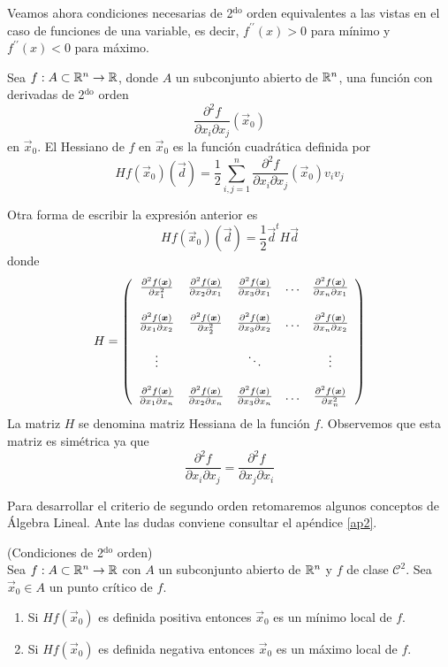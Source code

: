 Veamos ahora condiciones necesarias de 2$^{\text{do}}$ orden equivalentes a
las vistas en el caso de funciones de una variable, es decir, $f^{\prime
\prime}(x)>0$ para m\'inimo y $f^{\prime\prime}(x)<0$ para m\'aximo.
\begin{definicion}
Sea $f:A\subset \mathbb{R}^n \to \mathbb{R}$, donde $A$ un subconjunto abierto de $\mathbb{R}^{n}$, una funci\'on con
derivadas de 2$^{\text{do}}$ orden
\[
\frac{\partial^{2}f}{\partial x_i\partial x_{j}}(\vec{x}_{0})
\]
en $\vec{x}_{0}$. El Hessiano de $f$ en $\vec{x}_{0}$ es la funci\'on cuadr\'atica
definida por
\[
Hf(\vec{x}_{0})(\vec{d})=\frac{1}{2}\sum\limits_{i,j=1}^{n}\frac{\partial^{2}f}{\partial
x_i\partial x_{j}}(\vec{x}_{0})v_i v_{j}%
\]
\end{definicion}
Otra forma de escribir la expresi\'on anterior es
\[
Hf(\vec{x}_{0})(\vec{d})=\frac{1}{2}\vec{d}^t H \vec{d}
\]
donde
\begin{equation*}
H =\left(\begin{array}{ccccc}
\frac{\partial ^{2}f(\boldsymbol{x})}{\partial x_{1}^{2}} & \frac{\partial ^{2}f(\boldsymbol{x})}{\partial x_{2}\partial x_{1}} & \frac{\partial ^{2}f(\boldsymbol{x})}{\partial x_{3}\partial x_{1}} & \ldots & \frac{\partial ^{2}f(\boldsymbol{x})}{\partial x_{n}\partial x_{1}} \\
 & & & & \\
\frac{\partial ^{2}f(\boldsymbol{x})}{\partial x_{1}\partial x_{2}} & \frac{\partial ^{2}f(\boldsymbol{x})}{\partial x_{2}^{2}} & \frac{\partial ^{2}f(\boldsymbol{x})}{\partial x_{3}\partial x_{2}} & \ldots & \frac{\partial ^{2}f(\boldsymbol{x})}{\partial x_{n}\partial x_{2}} \\
 & & & & \\
\vdots &        & \ddots &        & \vdots \\
 & & & & \\
\frac{\partial ^{2}f(\boldsymbol{x})}{\partial x_{1}\partial x_{n}} & \frac{\partial ^{2}f(\boldsymbol{x})}{\partial x_{2}\partial x_{n}} & \frac{\partial ^{2}f(\boldsymbol{x})}{\partial x_{3}\partial x_{n}} & \ldots & \frac{\partial ^{2}f(\boldsymbol{x})}{\partial x_{n}^{2}} \\ \end{array} \right)
\end{equation*}
La matriz $H$ se denomina matriz Hessiana de la funci\'on $f$.
Observemos que esta matriz es sim\'etrica ya que
\[
\frac{\partial^{2}f}{\partial x_i\partial x_{j}}=\frac{\partial^{2}%
f}{\partial x_{j}\partial x_i}%
\]

Para desarrollar el criterio de segundo orden retomaremos algunos conceptos de \'Algebra Lineal. Ante las dudas conviene consultar el ap\'endice \ref{ap2}.

\begin{teorema}\label{2doorden}{\rm (Condiciones de 2$^{\text{do}}$ orden)}
\\Sea $f:A\subset \mathbb{R}^n \to\mathbb{R}$ con $A$ un
subconjunto abierto de $\mathbb{R}^{n}$ y $f$ de clase $\mathcal{C}^{2}$. Sea
$\vec{x}_{0}\in A$ un punto cr\'itico de $f$.
\begin{enumerate}
\item Si $Hf(\vec{x}_{0})$  es definida positiva entonces $\vec{x}_{0}$ es un
m\'inimo local de $f$.
\item Si $Hf(\vec{x}_{0})$  es definida negativa entonces $\vec{x}_{0}$ es un
m\'aximo local de $f$.
\end{enumerate}
\end{teorema}

